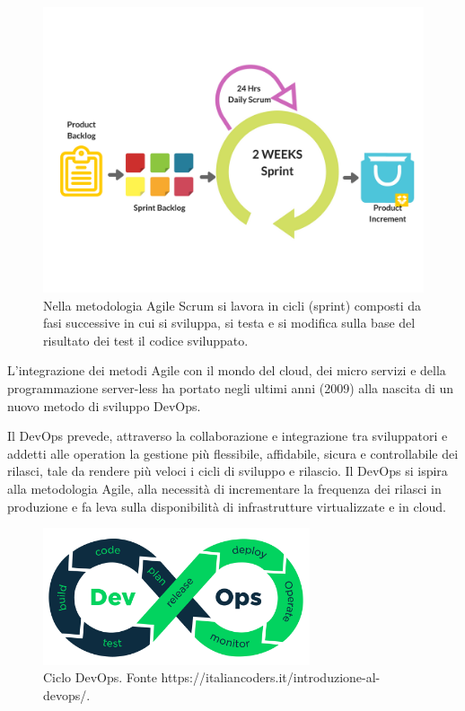 \begin{figure}[h!]
	\centering
	
		\includegraphics[width=\textwidth]{"immagini/Scrum-Agile-Marketing"}
	\caption{Nella metodologia Agile Scrum si lavora in cicli (sprint) composti da fasi successive in cui si sviluppa, si testa e si modifica sulla base del risultato dei test il codice sviluppato.}
\end{figure}

L'integrazione dei metodi Agile con il mondo del cloud, dei micro servizi e della programmazione server-less ha portato negli ultimi anni (2009) alla nascita di un nuovo metodo di sviluppo DevOps.

Il DevOps prevede, attraverso la collaborazione e integrazione tra sviluppatori e addetti alle operation la gestione più flessibile, affidabile, sicura e controllabile dei rilasci, tale da rendere più veloci i cicli di sviluppo e rilascio. Il DevOps si ispira alla metodologia Agile, alla necessità di incrementare la frequenza dei rilasci in produzione e fa leva sulla disponibilità di infrastrutture virtualizzate e in cloud.

\begin{figure}[h!]
	\centering
	\includegraphics[width=0.7\textwidth]{"immagini/devops-process"}
	\caption{Ciclo DevOps. Fonte https://italiancoders.it/introduzione-al-devops/.}
\end{figure}

